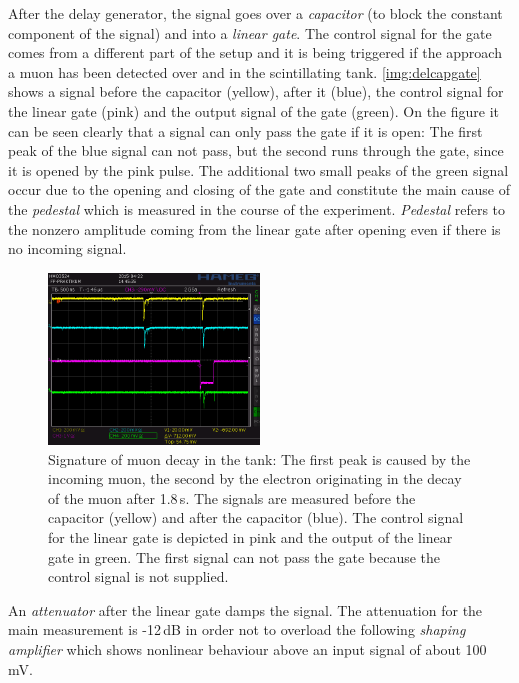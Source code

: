 After the delay generator, the signal goes over a \emph{capacitor} (to block the constant component of the signal)
and into a \emph{linear gate}.
The control signal for the gate comes from a different part of the setup and it is being triggered
if the approach a muon has been detected over and in the scintillating tank.
\autoref{img:delcapgate} shows a signal before the capacitor (yellow), after it (blue),
the control signal for the linear gate (pink) and the output signal of the gate (green).
On the figure it can be seen clearly that a signal can only pass the gate if it is open:
The first peak of the blue signal can not pass, but the second runs through the gate,
since it is opened by the pink pulse.
The additional two small peaks of the green signal occur due to the opening and closing of the gate
and constitute the main cause of the \emph{pedestal} which is measured in the course of the experiment.
\emph{Pedestal} refers to the nonzero amplitude coming from the linear gate after opening
even if there is no incoming signal.
\begin{figure}[H]
\begin{center}
  \includegraphics[width=0.5\textwidth]{../img/S0014.PNG}
  \caption{Signature of muon decay in the tank: The first peak is caused by the incoming muon,
  the second by the electron originating in the decay of the muon after 1.8\,\textmu s.
  The signals are measured before the capacitor (yellow) and after the capacitor (blue).
  The control signal for the linear gate is depicted in pink and the output of the linear gate in green.
  The first signal can not pass the gate because the control signal is not supplied.}
  \label{img:delcapgate}
\end{center}
\end{figure}
An \emph{attenuator} after the linear gate damps the signal.
The attenuation for the main measurement is -12\,dB in order not to overload the following \emph{shaping amplifier}
which shows nonlinear behaviour above an input signal of about 100\,mV.

